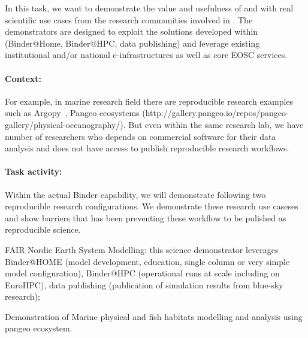 \begin{task}[
  title=Science demonstrators,
  id=demos,
  lead=MP,
  PM=8,
  wphases={0-36},
  partners={IFR,UIO}
]

  In this task, we want to demonstrate the value and usefulness of  and
   with real scientific use cases from the research communities involved in \TheProject.
  The demonstrators are designed to exploit the solutions developed within \TheProject (Binder@Home, Binder@HPC, data publishing) 
  and leverage existing institutional and/or national e-infrastructures as well as core EOSC services.

\paragraph*{Context:}  For example, in marine research field there are reproducible research examples such as Argopy~\cite{maze2020},  Pangeo ecosystems (http://gallery.pangeo.io/repos/pangeo-gallery/physical-oceanography/). But even within the same research lab, we have number of researchers who depends on commercial software for their data analysis and does not have access to publish reproducible research workflows.   


\paragraph*{Task activity:}
 
Within the actual Binder capability, we will demonstrate following two reproducible research configurations.  We demonstrate these research use caseses and show barriers that has been preventing these workflow to be pulished as reproducible science.   



  \begin{compactitem}
  \item FAIR Nordic Earth System Modelling: this science demonstrator leverages Binder@HOME (model development, education, single column or very simple model configuration), Binder@HPC (operational runs at scale including on EuroHPC), data publishing (publication of simulation results from blue-sky research);
  \item Demonstration of Marine physical and fish habitats modelling and analysis using pangeo ecosystem.  
  

\end{compactitem}
\end{task}
